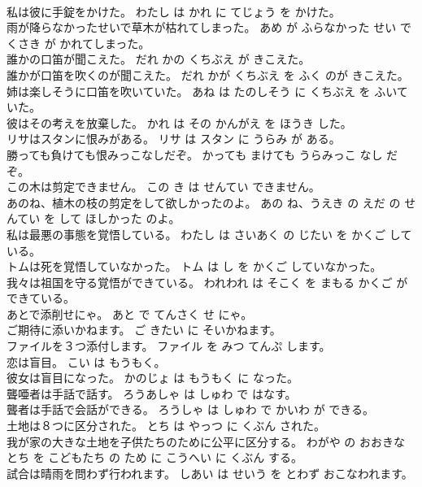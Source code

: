 \documentclass[8pt]{extreport}
\begin{document}
\begin{CJK}{UTF8}{min}
\\	私は彼に手錠をかけた。	わたし は かれ に てじょう を かけた。	
\\	雨が降らなかったせいで草木が枯れてしまった。	あめ が ふらなかった せい で くさき が かれてしまった。	
\\	誰かの口笛が聞こえた。	だれ かの くちぶえ が きこえた。	
\\	誰かが口笛を吹くのが聞こえた。	だれ かが くちぶえ を ふく のが きこえた。	
\\	姉は楽しそうに口笛を吹いていた。	あね は たのしそう に くちぶえ を ふいていた。	
\\	彼はその考えを放棄した。	かれ は その かんがえ を ほうき した。	
\\	リサはスタンに恨みがある。	リサ は スタン に うらみ が ある。	
\\	勝っても負けても恨みっこなしだぞ。	かっても まけても うらみっこ なし だぞ。	
\\	この木は剪定できません。	この き は せんてい できません。	
\\	あのね、植木の枝の剪定をして欲しかったのよ。	あの ね、うえき の えだ の せんてい を して ほしかった のよ。	
\\	私は最悪の事態を覚悟している。	わたし は さいあく の じたい を かくご している。	
\\	トムは死を覚悟していなかった。	トム は し を かくご していなかった。	
\\	我々は祖国を守る覚悟ができている。	われわれ は そこく を まもる かくご が できている。	
\\	あとで添削せにゃ。	あと で てんさく せ にゃ。	
\\	ご期待に添いかねます。	ご きたい に そいかねます。	
\\	ファイルを３つ添付します。	ファイル を みつ てんぷ します。	
\\	恋は盲目。	こい は もうもく。	
\\	彼女は盲目になった。	かのじょ は もうもく に なった。	
\\	聾唖者は手話で話す。	ろうあしゃ は しゅわ で はなす。	
\\	聾者は手話で会話ができる。	ろうしゃ は しゅわ で かいわ が できる。	
\\	土地は８つに区分された。	とち は やっつ に くぶん された。	
\\	我が家の大きな土地を子供たちのために公平に区分する。	わがや の おおきな とち を こどもたち の ため に こうへい に くぶん する。	
\\	試合は晴雨を問わず行われます。	しあい は せいう を とわず おこなわれます。	

\end{CJK}
\end{document}
